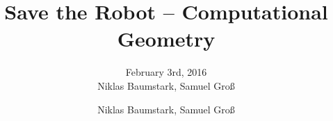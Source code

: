\documentclass[ngerman,hyperref={pdfpagelabels=true}]{beamer}
\title{Save the Robot -- Computational Geometry}
\subtitle{
February 3rd, 2016 \\ Niklas Baumstark, Samuel Groß
}
\author{Niklas Baumstark, Samuel Groß}
\institute{Institute of Theoretical Informatics}
\begin{document}
\setlength\textheight{7cm} %

\begin{frame}
  \maketitle
\end{frame}




%
%
\end{document}
